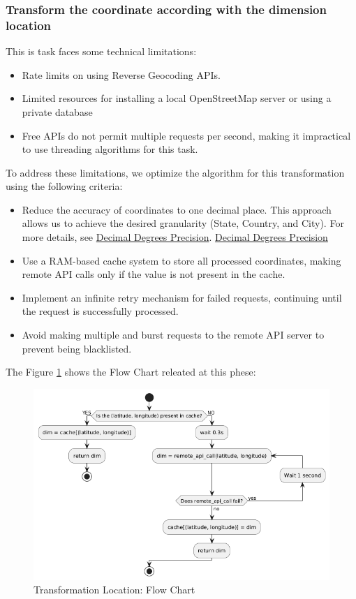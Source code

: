 \documentclass[conference]{IEEEtran}
\begin{document}
	\subsubsection{Transform the coordinate according with the dimension location}
	This is task faces some technical limitations:
	\begin{itemize}
		\item Rate limits on using Reverse Geocoding APIs.
		\item Limited resources for installing a local OpenStreetMap server or using a private database
		\item Free APIs do not permit multiple requests per second, making it impractical to use threading algorithms for this task.
	\end{itemize}
	
	To address these limitations, we optimize the algorithm for this transformation using the following criteria:
	\begin{itemize}
		\item Reduce the accuracy of coordinates to one decimal place. This approach allows us to achieve the desired granularity (State, Country, and City). For more details, see \href{https://en.wikipedia.org/wiki/Decimal_degrees#Precision}{Decimal Degrees Precision}. \href{https://en.wikipedia.org/wiki/Decimal_degrees#Precision}{Decimal Degrees Precision}
		\item Use a RAM-based cache system to store all processed coordinates, making remote API calls only if the value is not present in the cache.
		\item Implement an infinite retry mechanism for failed requests, continuing until the request is successfully processed.
		\item Avoid making multiple and burst requests to the remote API server to prevent being blacklisted. 
	\end{itemize}
	The Figure \ref{fig:flow_diagram_tranform_location} shows the Flow Chart releated at this phese:
	\begin{figure}[htpb]
		\centering
		\includegraphics[width=\columnwidth]{images/flow_diagram_tranform_location.png}
		\caption{Transformation Location: Flow Chart}
		\label{fig:flow_diagram_tranform_location}
	\end{figure}
	
\end{document}
